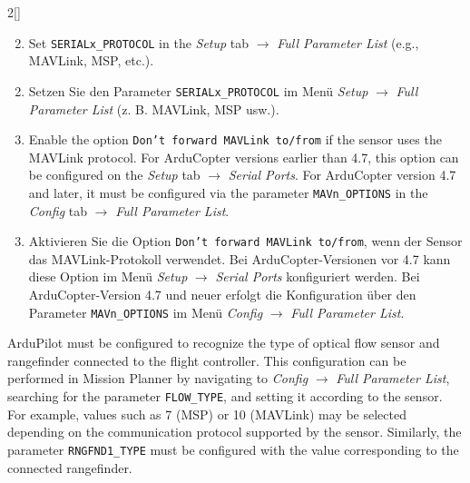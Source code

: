 \begin{paracol}{2}[]
\coleng

\begin{enumerate} 
\setcounter{enumi}{1}
\item Set \texttt{SERIALx\_PROTOCOL} in the \textit{Setup} tab \(\longrightarrow\) \textit{Full Parameter List} (e.g., MAVLink, MSP, etc.).
\end{enumerate} 

\colger

\begin{enumerate}
\setcounter{enumi}{1}
\item Setzen Sie den Parameter \texttt{SERIALx\_PROTOCOL} im Menü \textit{Setup} \(\longrightarrow\) \textit{Full Parameter List} (z. B. MAVLink, MSP usw.).
\end{enumerate}

\coleng

\begin{enumerate} 
\setcounter{enumi}{2}
\item Enable the option \texttt{Don’t forward MAVLink to/from} if the sensor uses the MAVLink protocol. For ArduCopter versions earlier than 4.7, this option can be configured on the \textit{Setup} tab \(\longrightarrow\) \textit{Serial Ports}. For ArduCopter version 4.7 and later, it must be configured via the parameter \texttt{MAVn\_OPTIONS} in the \textit{Config} tab \(\longrightarrow\) \textit{Full Parameter List}.
\end{enumerate} 

\colger

\begin{enumerate}
\setcounter{enumi}{2}
\item Aktivieren Sie die Option \texttt{Don’t forward MAVLink to/from}, wenn der Sensor das MAVLink-Protokoll verwendet. Bei ArduCopter-Versionen vor 4.7 kann diese Option im Menü \textit{Setup} \(\longrightarrow\) \textit{Serial Ports} konfiguriert werden. Bei ArduCopter-Version 4.7 und neuer erfolgt die Konfiguration über den Parameter \texttt{MAVn\_OPTIONS} im Menü \textit{Config} \(\longrightarrow\) \textit{Full Parameter List}.
\end{enumerate}

\colende
\renewcommand{\deutschertitel}{Konfigurationsschritt: B (Sensor)}
\renewcommand{\englischertitel}{Configuration Step: B (Sensor)}
\makrounterunterabschnitt

ArduPilot must be configured to recognize the type of optical flow sensor and rangefinder connected to the flight controller. This configuration can be performed in Mission Planner by navigating to \textit{Config} \(\longrightarrow\) \textit{Full Parameter List}, searching for the parameter \texttt{FLOW\_TYPE}, and setting it according to the sensor. For example, values such as 7 (MSP) or 10 (MAVLink) may be selected depending on the communication protocol supported by the sensor. Similarly, the parameter \texttt{RNGFND1\_TYPE} must be configured with the value corresponding to the connected rangefinder.


\end{paracol}
